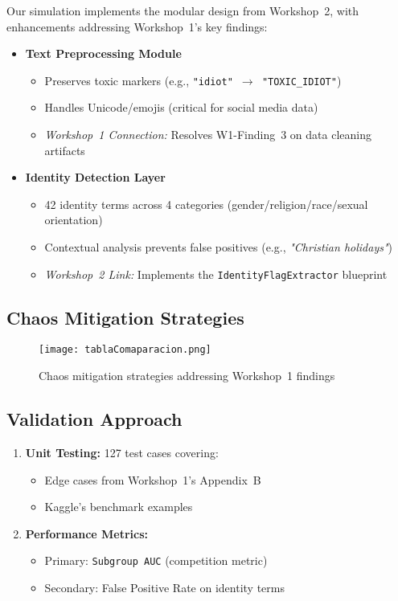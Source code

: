 \documentclass[conference]{IEEEtran}
\begin{document}
Our simulation implements the modular design from Workshop~2, with enhancements addressing Workshop~1's key findings:

\begin{itemize}
    \item \textbf{Text Preprocessing Module}
    \begin{itemize}
        \item Preserves toxic markers (e.g., \texttt{"idiot" $\rightarrow$ "TOXIC\_IDIOT"})
        \item Handles Unicode/emojis (critical for social media data)
        \item \textit{Workshop~1 Connection:} Resolves W1-Finding~3 on data cleaning artifacts
    \end{itemize}

    \item \textbf{Identity Detection Layer}
    \begin{itemize}
        \item 42 identity terms across 4 categories (gender/religion/race/sexual orientation)
        \item Contextual analysis prevents false positives (e.g., \textit{"Christian holidays"})
        \item \textit{Workshop~2 Link:} Implements the \texttt{IdentityFlagExtractor} blueprint
    \end{itemize}
\end{itemize}

\subsection{Chaos Mitigation Strategies}

\begin{figure}[h]
    \centering
    \texttt{[image: tablaComaparacion.png]}
    \caption{Chaos mitigation strategies addressing Workshop~1 findings}
    \label{fig:chaos_mitigation}
\end{figure}

\subsection{Validation Approach}

\begin{enumerate}
    \item \textbf{Unit Testing:} 127 test cases covering:
    \begin{itemize}
        \item Edge cases from Workshop~1's Appendix~B
        \item Kaggle's benchmark examples
    \end{itemize}
    
    \item \textbf{Performance Metrics:}
    \begin{itemize}
        \item Primary: \texttt{Subgroup~AUC} (competition metric)
        \item Secondary: False Positive Rate on identity terms
    \end{itemize}
\end{enumerate}
\end{document}
